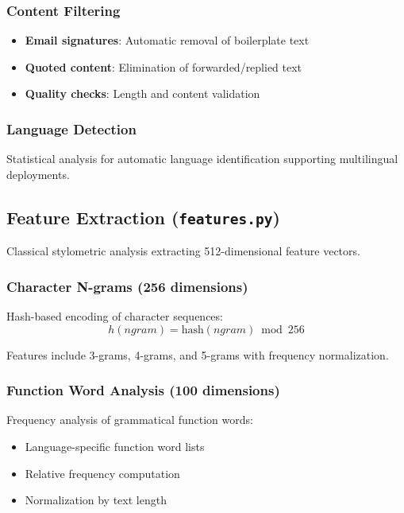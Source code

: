 \documentclass[12pt,a4paper]{article}
\begin{document}
\subsubsection{Content Filtering}
\begin{itemize}
    \item \textbf{Email signatures}: Automatic removal of boilerplate text
    \item \textbf{Quoted content}: Elimination of forwarded/replied text
    \item \textbf{Quality checks}: Length and content validation
\end{itemize}

\subsubsection{Language Detection}
Statistical analysis for automatic language identification supporting multilingual deployments.

\subsection{Feature Extraction (\texttt{features.py})}

Classical stylometric analysis extracting 512-dimensional feature vectors.

\subsubsection{Character N-grams (256 dimensions)}
Hash-based encoding of character sequences:
\begin{equation}
h(ngram) = \text{hash}(ngram) \bmod 256
\end{equation}

Features include 3-grams, 4-grams, and 5-grams with frequency normalization.

\subsubsection{Function Word Analysis (100 dimensions)}
Frequency analysis of grammatical function words:
\begin{itemize}
    \item Language-specific function word lists
    \item Relative frequency computation
    \item Normalization by text length
\end{itemize}
\end{document}
